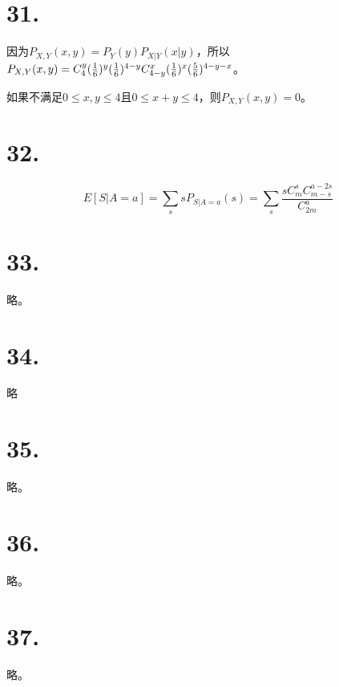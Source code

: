 \documentclass[UTF8]{report}
\begin{document}
    \section*{31.}
        因为$P_{X, Y}(x, y) = P_Y(y)P_{X|Y}(x|y)$，所以
        $P_{X,Y}(x, y) =\\
         C_4^y(\frac{1}{6})^y(\frac{1}{6})^{4 - y}C_{4 - y}^x(\frac{1}{6})^x(\frac{5}{6})^{4 - y - x}$。

         如果不满足$0 \leq x,y \leq 4$且$0 \leq x + y \leq 4$，则$P_{X, Y}(x, y) = 0$。
    \section*{32.}
        $$E[S|A = a] = \sum_{s}sP_{S|A = a}(s) = \sum_{s}\frac{sC_{m}^sC_{m - s}^{a - 2s}}{C_{2m}^a}$$
    \section*{33.}
        略。
    \section*{34.}
        略
    \section*{35.}
        略。
    \section*{36.}
        略。
    \section*{37.}
        略。
\end{document}
